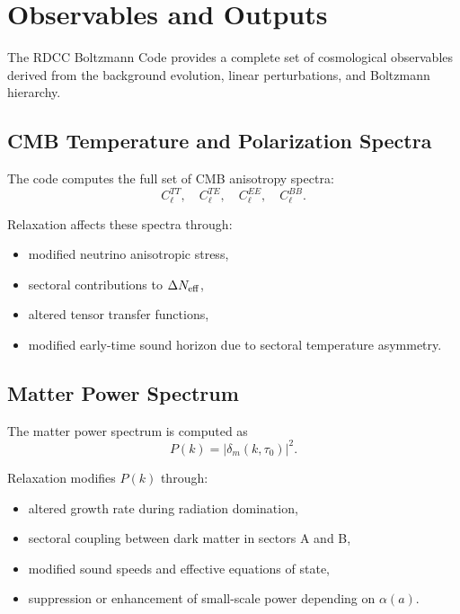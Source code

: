 \documentclass[11pt,a4paper]{article}
\begin{document}
\section{Observables and Outputs}

The RDCC Boltzmann Code provides a complete set of cosmological observables derived from
the background evolution, linear perturbations, and Boltzmann hierarchy.

\subsection{CMB Temperature and Polarization Spectra}

The code computes the full set of CMB anisotropy spectra:
\begin{equation}
C_\ell^{TT},\quad C_\ell^{TE},\quad C_\ell^{EE},\quad C_\ell^{BB}.
\end{equation}

Relaxation affects these spectra through:

\begin{itemize}
\item modified neutrino anisotropic stress,
\item sectoral contributions to $\Delta N_{\rm eff}$,
\item altered tensor transfer functions,
\item modified early-time sound horizon due to sectoral temperature asymmetry.
\end{itemize}

\subsection{Matter Power Spectrum}

The matter power spectrum is computed as
\begin{equation}
P(k) = |\delta_m(k,\tau_0)|^2.
\end{equation}

Relaxation modifies $P(k)$ through:

\begin{itemize}
\item altered growth rate during radiation domination,
\item sectoral coupling between dark matter in sectors A and B,
\item modified sound speeds and effective equations of state,
\item suppression or enhancement of small-scale power depending on $\alpha(a)$.
\end{itemize}
\end{document}

